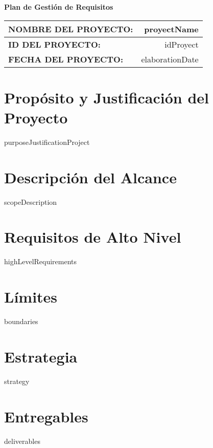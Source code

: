 \documentclass{article}
\begin{document}
    \begin{center}
    {\huge\textbf{Plan de Gestión de Requisitos}}
    \end{center}

    \vfill

    \renewcommand{\arraystretch}{1.5}

    \noindent
    \begin{tabularx}{0.6\textwidth}{|>{}L|>{}R|}
        \hline
        \textbf{NOMBRE DEL PROYECTO:} & {{proyectName}} \\
        \hline
        \textbf{ID DEL PROYECTO:} & {{idProyect}} \\
        \hline
        \textbf{FECHA DEL PROYECTO:} & {{elaborationDate}} \\
        \hline
    \end{tabularx}


    \newpage
    
    \tableofcontents
    \newpage
    
    \section{Propósito y Justificación del Proyecto}
    {{purposeJustificationProject}}
    
    \section{Descripción del Alcance}
    {{scopeDescription}}
    
    \section{Requisitos de Alto Nivel}
    {{highLevelRequirements}}
    
    \section{Límites}
    {{boundaries}}
    
    \section{Estrategia}
    {{strategy}}
    
    \section{Entregables}
    {{deliverables}}
\end{document}

